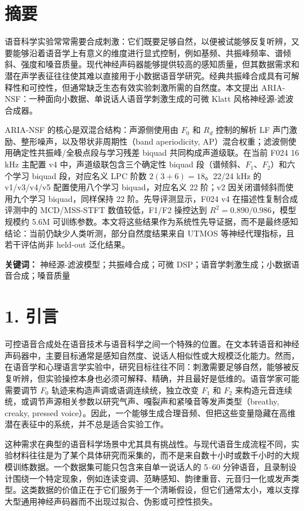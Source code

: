 \section{摘要}\label{ux6458ux8981}

语音科学实验常常需要合成刺激：它们既要足够自然，以便被试能够反复听辨，又要能够沿着语音学上有意义的维度进行显式控制，例如基频、共振峰频率、谱倾斜、强度和嗓音质量。现代神经声码器能够提供较高的感知质量，但其数据需求和潜在声学表征往往使其难以直接用于小数据语音学研究。经典共振峰合成具有可解释性和可控性，但通常缺乏生态有效实验刺激所需的自然度。本文提出
ARIA-NSF：一种面向小数据、单说话人语音学刺激生成的可微 Klatt
风格神经源-滤波合成器。

ARIA-NSF 的核心是双混合结构：声源侧使用由 \(F_0\) 和 \(R_d\) 控制的解析
LF 声门激励、整形噪声，以及带状非周期性（band aperiodicity,
AP）混合权重；滤波侧使用确定性共振峰/全极点段与学习残差 biquad
共同构成声道级联。在当前 F024 16 kHz 主配置 v4
中，声道级联包含三个确定性 biquad
段（谱倾斜、\(F_1\)、\(F_2\)）和六个学习 biquad 段，对应名义 LPC 阶数
\(2(3+6)=18\)。22/24 kHz 的 v1/v3/v4/v5 配置使用八个学习
biquad，对应名义 22 阶；v2 因关闭谱倾斜而使用九个学习 biquad，同样保持
22 阶。先导评测显示，F024 v4 在描述性复制合成评测中的 MCD/MSS-STFT
数值较低，F1/F2 操控达到 \(R^2=0.890/0.986\)，模型规模约 5.6M
可训练参数。本文将这些结果作为系统性先导证据，而不是最终感知结论：当前仍缺少人类听测，部分自然度结果来自
UTMOS 等神经代理指标，且若干评估尚非 held-out 泛化结果。

\textbf{关键词：} 神经源-滤波模型；共振峰合成；可微
DSP；语音学刺激生成；小数据语音合成；嗓音质量

\section{1. 引言}\label{ux5f15ux8a00}

可控语音合成处在语音技术与语音科学之间一个特殊的位置。在文本转语音和神经声码器中，主要目标通常是感知自然度、说话人相似性或大规模泛化能力。然而，在语音学和心理语言学实验中，研究目标往往不同：刺激需要足够自然，能够被反复听辨，但实验操控本身也必须可解释、精确，并且最好是低维的。语音学家可能需要调节
\(F_0\) 轨迹来构造声调或语调连续统，独立改变 \(F_1\) 和 \(F_2\)
来构造元音连续统，或调节声源相关参数以研究气声、嘎裂声和紧嗓音等发声类型（breathy,
creaky, pressed
voice）。因此，一个能够生成合理音频、但把这些变量隐藏在高维潜在表征中的系统，并不总是适合实验工作。

这种需求在典型的语音科学场景中尤其具有挑战性。与现代语音生成流程不同，实验材料往往是为了某个具体研究而采集的，而不是来自数十小时或数千小时的大规模训练数据。一个数据集可能只包含来自单一说话人的
5--60
分钟语音，且录制设计围绕一个特定现象，例如连读变调、范畴感知、韵律重音、元音归一化或发声类型。这类数据的价值正在于它们服务于一个清晰假设，但它们通常太小，难以支撑大型通用神经声码器而不出现过拟合、伪影或可控性损失。

